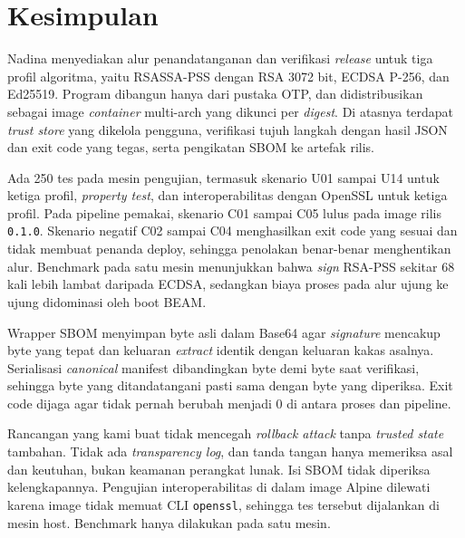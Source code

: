 \section{Kesimpulan}

Nadina menyediakan alur penandatanganan dan verifikasi \textit{release} untuk tiga profil
algoritma, yaitu RSASSA-PSS dengan RSA 3072 bit, ECDSA P-256, dan Ed25519. Program dibangun
hanya dari pustaka OTP, dan didistribusikan sebagai image \textit{container} multi-arch yang dikunci
per \textit{digest}. Di atasnya terdapat \textit{trust store} yang dikelola pengguna, verifikasi
tujuh langkah dengan hasil JSON dan exit code yang tegas, serta pengikatan SBOM ke artefak rilis.

Ada 250 tes pada mesin pengujian, termasuk skenario U01 sampai U14 untuk 
ketiga profil, \textit{property test}, dan interoperabilitas dengan
OpenSSL untuk ketiga profil. Pada pipeline pemakai, skenario C01 sampai C05 lulus pada image
rilis \texttt{0.1.0}. Skenario negatif C02 sampai C04 menghasilkan exit code yang sesuai dan tidak
membuat penanda deploy, sehingga penolakan benar-benar menghentikan alur. Benchmark pada satu
mesin menunjukkan bahwa \textit{sign} RSA-PSS sekitar 68 kali lebih lambat daripada ECDSA,
sedangkan biaya proses pada alur ujung ke ujung didominasi oleh boot BEAM.

Wrapper SBOM menyimpan byte asli dalam Base64 agar
\textit{signature} mencakup byte yang tepat dan keluaran \textit{extract} identik dengan keluaran
kakas asalnya. Serialisasi \textit{canonical} manifest dibandingkan byte demi byte saat verifikasi,
sehingga byte yang ditandatangani pasti sama dengan byte yang diperiksa. Exit code dijaga agar
tidak pernah berubah menjadi 0 di antara proses dan pipeline.

Rancangan  yang kami buat tidak mencegah \textit{rollback attack} tanpa \textit{trusted state}
tambahan. Tidak ada \textit{transparency log}, dan tanda tangan hanya memeriksa asal dan keutuhan,
bukan keamanan perangkat lunak. Isi SBOM tidak diperiksa kelengkapannya. Pengujian interoperabilitas
di dalam image Alpine dilewati karena image tidak memuat CLI \texttt{openssl}, sehingga tes tersebut
dijalankan di mesin host. Benchmark hanya dilakukan pada satu mesin.
